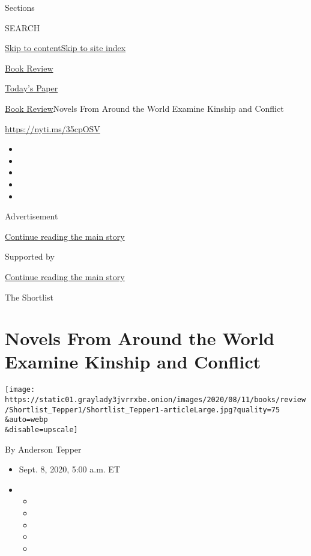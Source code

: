 Sections

SEARCH

\protect\hyperlink{site-content}{Skip to
content}\protect\hyperlink{site-index}{Skip to site index}

\href{https://www.nytimes3xbfgragh.onion/section/books/review}{Book
Review}

\href{https://myaccount.nytimes3xbfgragh.onion/auth/login?response_type=cookie\&client_id=vi}{}

\href{https://www.nytimes3xbfgragh.onion/section/todayspaper}{Today's
Paper}

\href{/section/books/review}{Book Review}\textbar{}Novels From Around
the World Examine Kinship and Conflict

\url{https://nyti.ms/35cpOSV}

\begin{itemize}
\item
\item
\item
\item
\item
\end{itemize}

Advertisement

\protect\hyperlink{after-top}{Continue reading the main story}

Supported by

\protect\hyperlink{after-sponsor}{Continue reading the main story}

The Shortlist

\hypertarget{novels-from-around-the-world-examine-kinship-and-conflict}{%
\section{Novels From Around the World Examine Kinship and
Conflict}\label{novels-from-around-the-world-examine-kinship-and-conflict}}

\texttt{[image: https://static01.graylady3jvrrxbe.onion/images/2020/08/11/books/review/Shortlist\_Tepper1/Shortlist\_Tepper1-articleLarge.jpg?quality=75\\\&auto=webp\\\&disable=upscale]}

By Anderson Tepper

\begin{itemize}
\item
  Sept. 8, 2020, 5:00 a.m. ET
\item
  \begin{itemize}
  \item
  \item
  \item
  \item
  \item
  \end{itemize}
\end{itemize}

